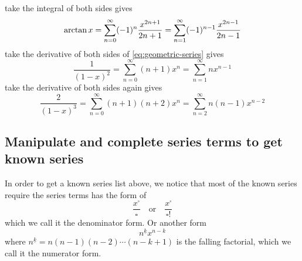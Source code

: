 \documentclass{overview}
\begin{document}
take the integral of both sides gives
\begin{equation}
	\arctan x = \sum_{n=0}^{\infty} (-1)^n \frac{x^{2n+1}}{2n+1}
	= \sum_{n=1}^{\infty}  (-1)^{n-1}\frac{x^{2n-1}}{2n-1}
\end{equation}
take the derivative of both sides of \eqref{eq:geometric-series} gives
\begin{equation}
	\frac{1}{(1-x)^2} = \sum_{n=0}^{\infty} (n+1) x^n = \sum_{n=1}^{\infty} n x^{n-1}
\end{equation}
take the derivative of both sides again gives
\begin{equation}
	\frac{2}{(1-x)^3} = \sum_{n=0}^{\infty} (n+1)(n+2) x^n = \sum_{n=2}^{\infty} n(n-1) x^{n-2}
\end{equation}

\subsection{Manipulate and complete series terms to get known series}

In order to get a known series list above, we notice that most of the known series
require the series terms has the form of
\[
	\frac{x^\square}{\square} \quad
	\text{or} \quad
	\frac{x^\square}{\square!}
\] 
which we call it the denominator form. Or another form
\[
	n^{\underline{k}} x^{n-k}
\] 
where $n^{\underline{k}} = n(n-1)(n-2)\cdots(n-k+1)$ is the falling factorial, 
which we call it the numerator form.
\end{document}
